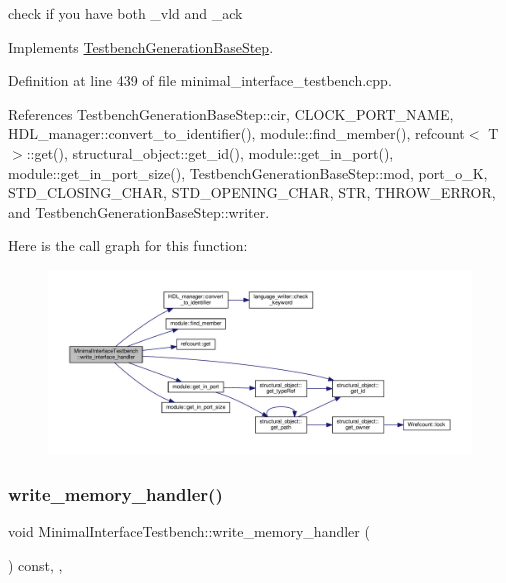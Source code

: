 check if you have both \+\_\+vld and \+\_\+ack 

Implements \hyperlink{classTestbenchGenerationBaseStep_a7568b1b1e16628fecd673da73e8ed71b}{Testbench\+Generation\+Base\+Step}.



Definition at line 439 of file minimal\+\_\+interface\+\_\+testbench.\+cpp.



References Testbench\+Generation\+Base\+Step\+::cir, C\+L\+O\+C\+K\+\_\+\+P\+O\+R\+T\+\_\+\+N\+A\+ME, H\+D\+L\+\_\+manager\+::convert\+\_\+to\+\_\+identifier(), module\+::find\+\_\+member(), refcount$<$ T $>$\+::get(), structural\+\_\+object\+::get\+\_\+id(), module\+::get\+\_\+in\+\_\+port(), module\+::get\+\_\+in\+\_\+port\+\_\+size(), Testbench\+Generation\+Base\+Step\+::mod, port\+\_\+o\+\_\+K, S\+T\+D\+\_\+\+C\+L\+O\+S\+I\+N\+G\+\_\+\+C\+H\+AR, S\+T\+D\+\_\+\+O\+P\+E\+N\+I\+N\+G\+\_\+\+C\+H\+AR, S\+TR, T\+H\+R\+O\+W\+\_\+\+E\+R\+R\+OR, and Testbench\+Generation\+Base\+Step\+::writer.

Here is the call graph for this function\+:
\nopagebreak
\begin{figure}[H]
\begin{center}
\leavevmode
\includegraphics[width=350pt]{d0/dba/classMinimalInterfaceTestbench_ab1139a5ae11ad46d2be19713199cb9e1_cgraph}
\end{center}
\end{figure}
\mbox{\label{classMinimalInterfaceTestbench_a7dd0527a7925eb55406a3db09adecf99}} 
\subsubsection{\texorpdfstring{write\+\_\+memory\+\_\+handler()}{write\_memory\_handler()}}
{\footnotesize\ttfamily void Minimal\+Interface\+Testbench\+::write\+\_\+memory\+\_\+handler (\begin{DoxyParamCaption}{ }\end{DoxyParamCaption}) const\hspace{0.3cm}{\ttfamily [override]}, {\ttfamily [protected]}, {\ttfamily [virtual]}}

